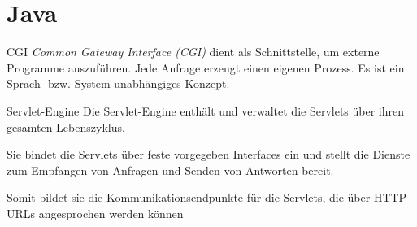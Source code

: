 \section{Java}

\begin{defi}{CGI}
    \emph{Common Gateway Interface (CGI)} dient als Schnittstelle, um externe Programme auszuführen.
    Jede Anfrage erzeugt einen eigenen Prozess.
    Es ist ein Sprach- bzw. System-unabhängiges Konzept.
\end{defi}

\begin{defi}{Servlet-Engine}
    Die Servlet-Engine enthält und verwaltet die Servlets über ihren gesamten Lebenszyklus.

    Sie bindet die Servlets über feste vorgegeben Interfaces ein und stellt die Dienste zum Empfangen von Anfragen und Senden von Antworten bereit.

    Somit bildet sie die Kommunikationsendpunkte für die Servlets, die über HTTP-URLs angesprochen werden können
\end{defi}

